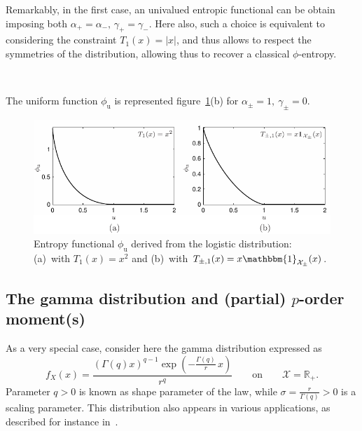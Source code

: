 \documentclass[entropy,article,submit,moreauthors,pdftex]{Definitions/mdpi}
\newcommand{\SZ}[1]{{\color{blue} #1}}                                       %
\newcommand{\Avoir}[1]{{\color{red}\bf #1}}                                  %
\def\Rset{\mathbb{R}}%
\def\X{\mathcal{X}}%
\def\un{\mathbbm{1}}%
\def\u{\mathrm{u}}
\begin{document}
{Remarkably, in  the first case, an  univalued entropic functional can  be obtain
imposing both $\alpha_+ = \alpha_-, \,  \gamma_+ = \gamma_-$.  Here also, such a
choice is  equivalent to considering the  constraint $T_1(x) = |x|$,  and thus
allows to respect the symmetries of the distribution, allowing thus to recover a
classical $\phi$-entropy.

\

The        uniform        function        $\phi_\u$        is        represented
figure~\ref{fig:Entropy-logistic}(b) for $\alpha_\pm = 1, \: \gamma_\pm = 0$.

\begin{figure}[htbp]
\centerline{\includegraphics[width=\columnwidth]{PDF/MaxEnt_LogisticLaw}}
\caption{Entropy  functional  $\phi_\u$   derived  from  the  logistic
  distribution:  (a)~with  $T_1(x)  =  x^2$   and  (b)~with  $T_{\pm,1}(x)  =  x
  \un_{\X_\pm}(x)$.}
\label{fig:Entropy-logistic}
\end{figure}
}

  



\subsection{The gamma distribution and (partial) $p$-order moment(s)}
\label{subsecapp:GammaFirstOrder}

As a very special case, consider here the gamma distribution expressed as
%
\SZ{
\[
f_X(x) = \frac{\left( \Gamma(q)  x \right)^{q-1} \exp\left(- \frac{\Gamma(q)}{r}
  \, x \right)}{r^q} \qquad \mbox{on} \qquad \X = \Rset_+.
\]
%
Parameter  $q >  0$ is  known as  shape parameter  of the  law, while  $\sigma =
\frac{r}{\Gamma(q)} > 0$ is a  scaling parameter. This distribution also appears
in various applications, as described for instance in~\cite{JohKot95:v1}.}
\end{document}
